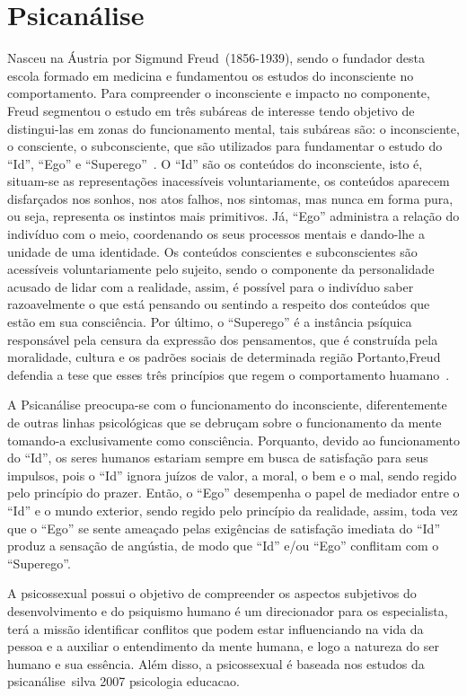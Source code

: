 \section{Psicanálise}\label{psicanalise}

Nasceu na Áustria por Sigmund Freud~(1856-1939), sendo o fundador desta escola formado em medicina e fundamentou os estudos do inconsciente no comportamento.
Para compreender o inconsciente e impacto no componente, Freud segmentou o estudo em três subáreas de interesse tendo objetivo de distingui-las em zonas do funcionamento mental, tais subáreas são: o inconsciente, o consciente, o subconsciente, que são utilizados para fundamentar o estudo do ``Id'', ``Ego'' e ``Superego''~\cite{hothersall1997historia}. 
O ``Id'' são os conteúdos do inconsciente, isto é, situam-se as representações inacessíveis voluntariamente, os conteúdos aparecem disfarçados nos sonhos, nos atos falhos, nos sintomas, mas nunca em forma pura, ou seja, representa os instintos mais primitivos. 
Já, ``Ego'' administra a relação do indivíduo com o meio, coordenando os seus processos mentais e dando-lhe a unidade de uma identidade. 
Os conteúdos conscientes e subconscientes são acessíveis voluntariamente pelo sujeito, sendo o componente da personalidade acusado de lidar com a realidade, assim, é possível para o indivíduo saber razoavelmente o que está pensando ou sentindo a respeito dos conteúdos que estão em sua consciência.
Por último, o ``Superego'' é a instância psíquica responsável pela censura da expressão dos pensamentos, que é construída pela moralidade, cultura e os padrões sociais de determinada região
Portanto,Freud defendia a tese que esses três princípios que regem o comportamento huamano~\cite{silva2007psicologia_educacao}.

A Psicanálise preocupa-se com o funcionamento do inconsciente, diferentemente de outras linhas psicológicas que se debruçam sobre o funcionamento da mente tomando-a exclusivamente como consciência.
Porquanto, devido ao funcionamento do ``Id'', os seres humanos estariam sempre em busca de satisfação para seus impulsos, pois o ``Id'' ignora juízos de valor, a moral, o bem e o mal, sendo regido pelo princípio do prazer.
Então, o ``Ego'' desempenha o papel de mediador entre o ``Id'' e o mundo exterior, sendo regido pelo
princípio da realidade, assim, toda vez que o ``Ego'' se sente ameaçado pelas exigências de satisfação
imediata do ``Id'' produz a sensação de angústia, de modo que  ``Id'' e/ou ``Ego'' conflitam com o ``Superego''.

A psicossexual possui o objetivo de compreender os aspectos subjetivos do desenvolvimento e do psiquismo humano é um direcionador para os especialista, terá a missão identificar conflitos que podem estar influenciando na vida da pessoa e a auxiliar o entendimento da mente humana, e logo a natureza do ser humano e sua essência.
Além disso, a psicossexual é baseada nos estudos da psicanálise~{silva 2007 psicologia educacao}. 

